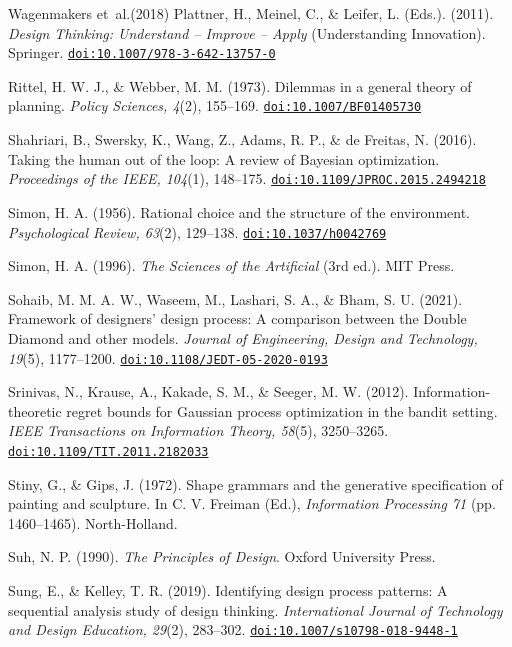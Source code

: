 \documentclass[11pt]{article}
\providecommand{\doi}[1]{\href{https://doi.org/#1}{\nolinkurl{doi:#1}}}
\begin{document}
\begin{thebibliography}{Wagenmakers et~al.(2018)}
 Plattner, H., Meinel, C., \& Leifer, L. (Eds.). (2011). \textit{Design Thinking: Understand -- Improve -- Apply} (Understanding Innovation). Springer. \doi{10.1007/978-3-642-13757-0}

 Rittel, H. W. J., \& Webber, M. M. (1973). Dilemmas in a general theory of planning. \textit{Policy Sciences, 4}(2), 155--169. \doi{10.1007/BF01405730}

 Shahriari, B., Swersky, K., Wang, Z., Adams, R. P., \& de Freitas, N. (2016). Taking the human out of the loop: A review of Bayesian optimization. \textit{Proceedings of the IEEE, 104}(1), 148--175. \doi{10.1109/JPROC.2015.2494218}

 Simon, H. A. (1956). Rational choice and the structure of the environment. \textit{Psychological Review, 63}(2), 129--138. \doi{10.1037/h0042769}

 Simon, H. A. (1996). \textit{The Sciences of the Artificial} (3rd ed.). MIT Press.

 Sohaib, M. M. A. W., Waseem, M., Lashari, S. A., \& Bham, S. U. (2021). Framework of designers' design process: A comparison between the Double Diamond and other models. \textit{Journal of Engineering, Design and Technology, 19}(5), 1177--1200. \doi{10.1108/JEDT-05-2020-0193}

 Srinivas, N., Krause, A., Kakade, S. M., \& Seeger, M. W. (2012). Information-theoretic regret bounds for Gaussian process optimization in the bandit setting. \textit{IEEE Transactions on Information Theory, 58}(5), 3250--3265. \doi{10.1109/TIT.2011.2182033}

 Stiny, G., \& Gips, J. (1972). Shape grammars and the generative specification of painting and sculpture. In C. V. Freiman (Ed.), \textit{Information Processing 71} (pp. 1460--1465). North-Holland.

 Suh, N. P. (1990). \textit{The Principles of Design}. Oxford University Press.

 Sung, E., \& Kelley, T. R. (2019). Identifying design process patterns: A sequential analysis study of design thinking. \textit{International Journal of Technology and Design Education, 29}(2), 283--302. \doi{10.1007/s10798-018-9448-1}


\end{thebibliography}
\end{document}
